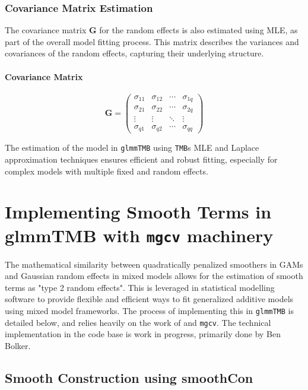 \documentclass[12pt, twoside,hidelinks]{article}
\theoremstyle{definition}
\numberwithin{equation}{section}
\begin{document}
\subsubsection{Covariance Matrix Estimation}\label{sec:rpack:construct:covmat}

The covariance matrix \( \mathbf{G} \) for the random effects is also estimated using MLE, as part of the overall model fitting process. This matrix describes the variances and covariances of the random effects, capturing their underlying structure.

\paragraph{Covariance Matrix}

\begin{equation}
\mathbf{G} = \begin{pmatrix}
\sigma_{11} & \sigma_{12} & \cdots & \sigma_{1q} \\
\sigma_{21} & \sigma_{22} & \cdots & \sigma_{2q} \\
\vdots & \vdots & \ddots & \vdots \\
\sigma_{q1} & \sigma_{q2} & \cdots & \sigma_{qq}
\end{pmatrix}
\end{equation}

The estimation of the model in \texttt{glmmTMB} using \texttt{TMB}s MLE and Laplace approximation techniques ensures efficient and robust fitting, especially for complex models with multiple fixed and random effects.

\section{Implementing Smooth Terms in glmmTMB with \texttt{mgcv} machinery}\label{sec:makingsmooth}

The mathematical similarity between quadratically penalized smoothers in GAMs and Gaussian random effects in mixed models allows for the estimation of smooth terms as "type 2 random effects". This is leveraged in statistical modelling software to provide flexible and efficient ways to fit generalized additive models using mixed model frameworks. The process of implementing this in \texttt{glmmTMB} is detailed below, and relies heavily on the work of \citet{wood2017} and \texttt{mgcv}. The technical implementation in the code base is work in progress, primarily done by Ben Bolker.

\subsection{Smooth Construction using smoothCon}\label{sec:makingsmooth:smoothcon}
\end{document}
